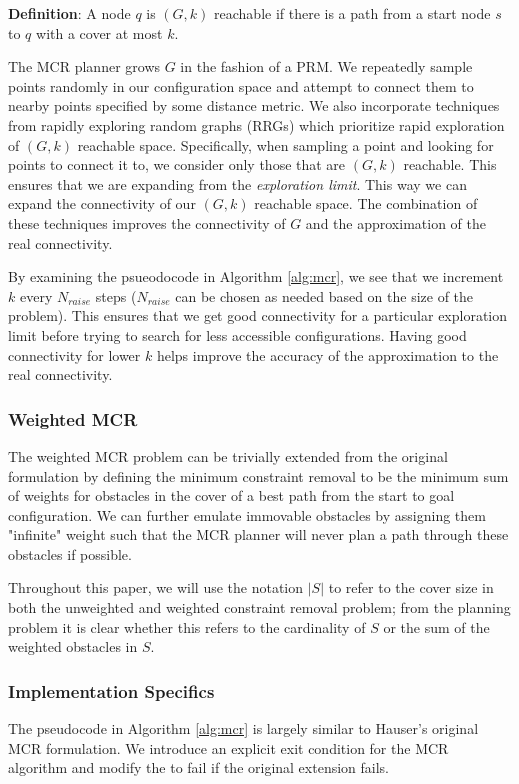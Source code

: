 {\bf{Definition}}: A node $q$ is $(G,k)$ reachable if there is a path from a start node $s$ to $q$ with a cover at most $k$. 

The MCR planner grows $G$ in the fashion of a PRM. We repeatedly sample points randomly in our configuration space and attempt to connect them to nearby points specified by some distance metric. We also incorporate techniques from rapidly exploring random graphs (RRGs) which prioritize rapid exploration of $(G,k)$ reachable space. Specifically, when sampling a point and looking for points to connect it to, we consider only those that are $(G,k)$ reachable. This ensures that we are expanding from the \emph{exploration limit}. This way we can expand the connectivity of our $(G,k)$ reachable space. The combination of these techniques improves the connectivity of $G$ and the approximation of the real connectivity. 

By examining the psueodocode in Algorithm \ref{alg:mcr}, we see that we increment $k$ every $N_{raise}$ steps ($N_{raise}$ can be chosen as needed based on the size of the problem). This ensures that we get good connectivity for a particular exploration limit before trying to search for less accessible configurations. Having good connectivity for lower $k$ helps improve the accuracy of the approximation to the real connectivity. 

\subsubsection{Weighted MCR}
The weighted MCR problem can be trivially extended from the original formulation by defining the minimum constraint removal to be the minimum sum of weights for obstacles in the cover of a best path from the start to goal configuration. We can further emulate immovable obstacles by assigning them "infinite" weight such that the MCR planner will never plan a path through these obstacles if possible. 

Throughout this paper, we will use the notation $|S|$ to refer to the cover size in both the unweighted and weighted constraint removal problem; from the planning problem it is clear whether this refers to the cardinality of $S$ or the sum of the weighted obstacles in $S$. 

\subsubsection{Implementation Specifics}
The pseudocode in Algorithm \ref{alg:mcr} is largely similar to Hauser's original MCR formulation. We introduce an explicit exit condition for the MCR algorithm and modify the  to fail if the original extension fails. 

